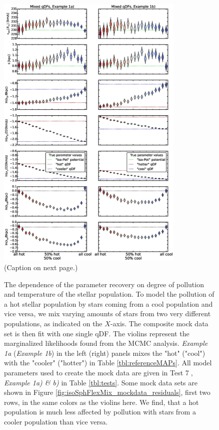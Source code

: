 \begin{figure}
\centering
\includegraphics[width=0.8\textwidth]{figs/isoSphFlexMixCont_violins.eps}
\caption{(Caption on next page.)}
\end{figure}


\addtocounter{figure}{-1}
\begin{figure} [t!]
\caption{The dependence of the parameter recovery on degree of pollution and temperature of the stellar population. To model the pollution of a hot stellar population by stars coming from a cool population and vice versa, we mix varying amounts of stars from two very different populations, as indicated on the $X$-axis. The composite mock data set is then fit with one single qDF. The violins represent the marginalized likelihoods found from the MCMC analysis. \emph{Example 1a} (\emph{Example 1b}) in the left (right) panels mixes the "hot" ("cool") \MAP with the "cooler" ("hotter") \MAP in Table \ref{tbl:referenceMAPs}. All model parameters used to create the mock data are given in Test \textcircled{7}, \emph{Example 1a) \& b)} in Table \ref{tbl:tests}. Some mock data sets are shown in Figure \ref{fig:isoSphFlexMix_mockdata_residuals}, first two rows, in the same colors as the violins here.  We find, that a hot population is much less affected by pollution with stars from a cooler population than vice versa.}
\label{fig:isoSphFlexMixCont}
\end{figure}



